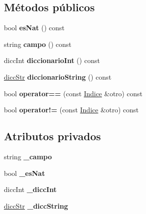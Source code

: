 \subsection*{Métodos públicos}
\begin{DoxyCompactItemize}
\item 
\hypertarget{classIndice_a3364b63e1daa8abc12f828fa0082f400}{bool {\bfseries es\+Nat} () const }\label{classIndice_a3364b63e1daa8abc12f828fa0082f400}

\item 
\hypertarget{classIndice_a16b3697713467615b488ce637ced3c91}{string {\bfseries campo} () const }\label{classIndice_a16b3697713467615b488ce637ced3c91}

\item 
\hypertarget{classIndice_ab5b9a80202da3ec4b3d3b72c344518b1}{dicc\+Int {\bfseries diccionario\+Int} () const }\label{classIndice_ab5b9a80202da3ec4b3d3b72c344518b1}

\item 
\hypertarget{classIndice_a0829d40cb463c28da0a14313c4f9b919}{\hyperlink{classstring__map}{dicc\+Str} {\bfseries diccionario\+String} () const }\label{classIndice_a0829d40cb463c28da0a14313c4f9b919}

\item 
\hypertarget{classIndice_af350a9f5a698845b8b893544bd6bfdb4}{bool {\bfseries operator==} (const \hyperlink{classIndice}{Indice} \&otro) const }\label{classIndice_af350a9f5a698845b8b893544bd6bfdb4}

\item 
\hypertarget{classIndice_a073dcff8cf679b2831a6ba966535d27b}{bool {\bfseries operator!=} (const \hyperlink{classIndice}{Indice} \&otro) const }\label{classIndice_a073dcff8cf679b2831a6ba966535d27b}

\end{DoxyCompactItemize}
\subsection*{Atributos privados}
\begin{DoxyCompactItemize}
\item 
\hypertarget{classIndice_a19d3fb15c7b809d40b199bbb34285098}{string {\bfseries \+\_\+campo}}\label{classIndice_a19d3fb15c7b809d40b199bbb34285098}

\item 
\hypertarget{classIndice_a51f53fe730121b204cbf1370f55974ff}{bool {\bfseries \+\_\+es\+Nat}}\label{classIndice_a51f53fe730121b204cbf1370f55974ff}

\item 
\hypertarget{classIndice_a243d766fb80810fa14b6385787193df1}{dicc\+Int {\bfseries \+\_\+dicc\+Int}}\label{classIndice_a243d766fb80810fa14b6385787193df1}

\item 
\hypertarget{classIndice_aa0814018f834817cbc09c8a5b9611dad}{\hyperlink{classstring__map}{dicc\+Str} {\bfseries \+\_\+dicc\+String}}\label{classIndice_aa0814018f834817cbc09c8a5b9611dad}

\end{DoxyCompactItemize}
